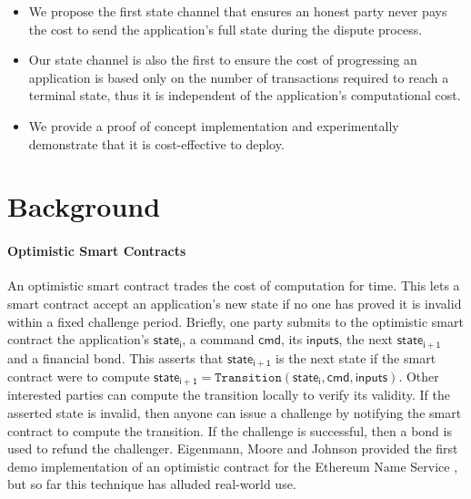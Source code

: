 \documentclass{llncs}
\newcommand{\cmd}{\mathsf{cmd}}
\newcommand{\inputs}{\mathsf{inputs}}
\newcommand{\stateinfoi}{\mathsf{state}_{\mathsf{i}}}
\newcommand{\stateinfoplus}{\mathsf{state}_{\mathsf{i+1}}}
\begin{document}
\begin{itemize}
	\item We propose the first state channel that ensures an honest party never pays the cost to send the application's full state during the dispute process.
	\item Our state channel is also the first to ensure the cost of progressing an application is based only on the number of transactions required to reach a terminal state, thus it is independent of the application's computational cost.
	\item We provide a proof of concept implementation and experimentally demonstrate that it is cost-effective to deploy. 
\end{itemize}

\section{Background} 

\paragraph{Optimistic Smart Contracts } 


An optimistic smart contract trades the cost of computation for time.
This lets a smart contract accept an application's new state if no one has proved it is invalid within a fixed challenge period. 
Briefly, one party submits to the optimistic smart contract the application's $\stateinfoi$, a command $\cmd$, its $\inputs$, the next $\stateinfoplus$ and a financial bond. 
This asserts that $\stateinfoplus$ is the next state if the smart contract were to compute  $\stateinfoplus = \texttt{Transition}(\stateinfoi, \cmd, \inputs)$. 
Other interested parties can compute the transition locally to verify its validity.
If the asserted state is invalid, then anyone can issue a challenge by notifying the smart contract to compute the transition.
If the challenge is successful, then a bond is used to refund the challenger. 
Eigenmann, Moore and Johnson provided the first demo implementation of an optimistic contract for the Ethereum Name Service
\cite{optimisticcontracts}, but so far this technique has alluded real-world use. 
\end{document}
